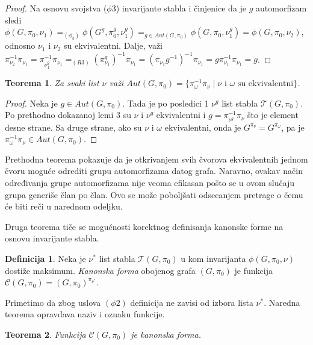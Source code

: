 \documentclass[12pt,oneside]{memoir}
\newtheorem{theorem}{Teorema}
\theoremstyle{definition}
\newtheorem*{definition}{Definicija}
\begin{document}
  \begin{proof}
	  Na osnovu svojstva ($\phi3$) invarijante stabla i činjenice da je $g$
	  automorfizam sledi $\phi(G, \pi_0, \nu_1) =_{(\phi_3)} \phi(G^g, \pi_0^g,
	  \nu_1^g) =_{g \in Aut(G, \pi_0)} \phi(G, \pi_0, \nu_1^g) = \phi(G, \pi_0,
	  \nu_2)$, odnosno $\nu_1$ i $\nu_2$ su ekvivalentni. Dalje, važi
	  $\pi_{\nu_2}^{-1}\pi_{\nu_1} = \pi_{\nu_1^g}^{-1}\pi_{\nu_1} =_{(R3)}
	  (\pi_{\nu_1}^g)^{-1}\pi_{\nu_1} = (\pi_{\nu_1} g^{-1})^{-1} \pi_{\nu_1} = g
	  \pi_{\nu_1}^{-1} \pi_{\nu_1} = g$.
  \end{proof}

  \begin{theorem}
	  Za svaki list $\nu$ važi $Aut(G, \pi_0) = \{\pi_{\omega}^{-1}\pi_{\nu}
	  \mid \text{$\nu$ i $\omega$ su ekvivalentni} \}$.
  \end{theorem}
  
  \begin{proof}
	  Neka je $g \in Aut(G, \pi_0)$. Tada je po posledici 1 $\nu^g$ list stabla
	  $\mathcal{T}(G, \pi_0)$. Po prethodno dokazanoj lemi 3 su $\nu$ i $\nu^g$
	  ekvivalentni i $g = \pi_{\nu^g}^{-1}\pi_\nu$ što je element desne strane.
	  Sa druge strane, ako su $\nu$ i $\omega$ ekvivalentni, onda je
	  $G^{\pi_\nu} = G^{\pi_\omega}$, pa je $\pi_\omega^{-1}\pi_\nu \in Aut(G,
	  \pi_0)$.
  \end{proof}

	Prethodna teorema pokazuje da je otkrivanjem svih čvorova ekvivalentnih
	jednom čvoru moguće odrediti grupu automorfizama datog grafa. Naravno, ovakav
	način određivanja grupe automorfizama nije veoma efikasan pošto se u ovom
	slučaju grupa generiše član po član. Ovo se može poboljšati odsecanjem
	pretrage o čemu će biti reči u narednom odeljku.

	Druga teorema tiče se mogućnosti korektnog definisanja kanonske forme na
	osnovu invarijante stabla.

  \begin{definition}
	  Neka je $\nu^*$ list stabla $\mathcal{T}(G, \pi_0)$ u kom invarijanta
	  $\phi(G, \pi_0, \nu)$ dostiže maksimum. \emph{Kanonska forma} obojenog
	  grafa $(G, \pi_0)$ je funkcija $\mathcal{C}(G, \pi_0) = (G,
	  \pi_0)^{\pi_{\nu^*}}$.
  \end{definition}

  Primetimo da zbog uslova $(\phi2)$ definicija ne zavisi od izbora lista
  $\nu^*$. Naredna teorema opravdava naziv i oznaku funkcije.

  \begin{theorem}
	  Funkcija $\mathcal{C}(G, \pi_0)$ je kanonska forma.
  \end{theorem}
\end{document}

